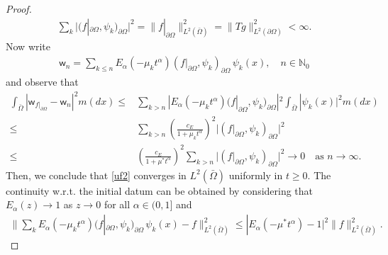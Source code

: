 \documentclass[11pt,a4paper]{article}
\begin{document}
\begin{proof}
\begin{align}
\sum_{k} \big| (f|_{\partial \Omega}, \psi_k)_{\partial \Omega} \big|^2 = \| f|_{\partial \Omega} \|^2_{L^2(\bar{\Omega})} = \| Tg \|^2_{L^2(\partial \Omega)} < \infty.
\label{L2fourierf}
\end{align}
Now write
\begin{align}
\mathsf{w}_n = \sum_{k \leq n} E_\alpha(-\mu_k t^\alpha) (f|_{\partial \Omega}, \psi_k)_{\partial \Omega}\, \psi_k(x), \quad n \in \mathbb{N}_0
\label{defSERIESwn}
\end{align}
and observe that
\begin{align*}
\int_{\bar{\Omega}}| \mathsf{w}_{f|_{\partial \Omega}} - \mathsf{w}_{n} |^2 m(dx)
\leq &  \sum_{k > n} | E_\alpha(-\mu_k t^\alpha) (f|_{\partial \Omega}, \psi_k)_{\partial \Omega}|^2 \int_{\bar{\Omega}}|\psi_k(x) |^2 m(dx)\\ 
\leq &  \sum_{k > n} \left(\frac{c_E}{1+ \mu_k t^\alpha}\right)^2 \big| (f|_{\partial \Omega}, \psi_k)_{\partial \Omega} \big|^2\\
\leq &  \left(\frac{c_E}{1+ \mu^* t^\alpha}\right)^2 \sum_{k > n} \big| (f|_{\partial \Omega}, \psi_k)_{\partial \Omega} \big|^2 \to 0 \quad \textrm{as } n\to \infty.
\end{align*}
Then, we conclude that \eqref{uf2} converges in $L^2(\bar{\Omega})$ uniformly in $t\geq 0$. The continuity w.r.t. the initial datum can be obtained by considering that $E_\alpha(z) \to 1$ as $z\to 0$ for all $\alpha \in (0,1]$ and
\begin{align*}
\Big\| \sum_k E_\alpha(-\mu_k t^\alpha) (f|_{\partial \Omega}, \psi_k)_{\partial \Omega}\, \psi_k(x)  - f \Big\|^2_{L^2(\bar{\Omega})} \leq  | E_\alpha(-\mu^* t^\alpha) - 1 |^2 \|f \|^2_{L^2(\bar{\Omega})}.
\end{align*}



\end{proof}
\end{document}

